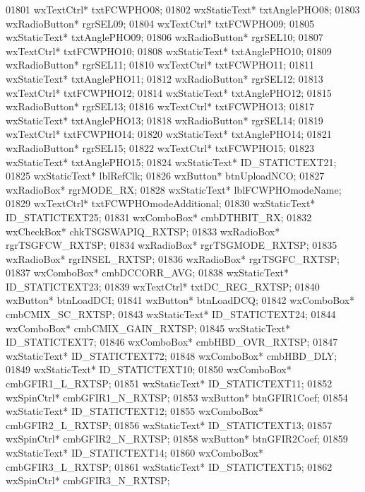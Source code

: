 \begin{DoxyCode}
01801         wxTextCtrl* txtFCWPHO08;
01802         wxStaticText* txtAnglePHO08;
01803         wxRadioButton* rgrSEL09;
01804         wxTextCtrl* txtFCWPHO09;
01805         wxStaticText* txtAnglePHO09;
01806         wxRadioButton* rgrSEL10;
01807         wxTextCtrl* txtFCWPHO10;
01808         wxStaticText* txtAnglePHO10;
01809         wxRadioButton* rgrSEL11;
01810         wxTextCtrl* txtFCWPHO11;
01811         wxStaticText* txtAnglePHO11;
01812         wxRadioButton* rgrSEL12;
01813         wxTextCtrl* txtFCWPHO12;
01814         wxStaticText* txtAnglePHO12;
01815         wxRadioButton* rgrSEL13;
01816         wxTextCtrl* txtFCWPHO13;
01817         wxStaticText* txtAnglePHO13;
01818         wxRadioButton* rgrSEL14;
01819         wxTextCtrl* txtFCWPHO14;
01820         wxStaticText* txtAnglePHO14;
01821         wxRadioButton* rgrSEL15;
01822         wxTextCtrl* txtFCWPHO15;
01823         wxStaticText* txtAnglePHO15;
01824         wxStaticText* ID_STATICTEXT21;
01825         wxStaticText* lblRefClk;
01826         wxButton* btnUploadNCO;
01827         wxRadioBox* rgrMODE_RX;
01828         wxStaticText* lblFCWPHOmodeName;
01829         wxTextCtrl* txtFCWPHOmodeAdditional;
01830         wxStaticText* ID_STATICTEXT25;
01831         wxComboBox* cmbDTHBIT_RX;
01832         wxCheckBox* chkTSGSWAPIQ_RXTSP;
01833         wxRadioBox* rgrTSGFCW_RXTSP;
01834         wxRadioBox* rgrTSGMODE_RXTSP;
01835         wxRadioBox* rgrINSEL_RXTSP;
01836         wxRadioBox* rgrTSGFC_RXTSP;
01837         wxComboBox* cmbDCCORR_AVG;
01838         wxStaticText* ID_STATICTEXT23;
01839         wxTextCtrl* txtDC_REG_RXTSP;
01840         wxButton* btnLoadDCI;
01841         wxButton* btnLoadDCQ;
01842         wxComboBox* cmbCMIX_SC_RXTSP;
01843         wxStaticText* ID_STATICTEXT24;
01844         wxComboBox* cmbCMIX_GAIN_RXTSP;
01845         wxStaticText* ID_STATICTEXT7;
01846         wxComboBox* cmbHBD_OVR_RXTSP;
01847         wxStaticText* ID_STATICTEXT72;
01848         wxComboBox* cmbHBD_DLY;
01849         wxStaticText* ID_STATICTEXT10;
01850         wxComboBox* cmbGFIR1_L_RXTSP;
01851         wxStaticText* ID_STATICTEXT11;
01852         wxSpinCtrl* cmbGFIR1_N_RXTSP;
01853         wxButton* btnGFIR1Coef;
01854         wxStaticText* ID_STATICTEXT12;
01855         wxComboBox* cmbGFIR2_L_RXTSP;
01856         wxStaticText* ID_STATICTEXT13;
01857         wxSpinCtrl* cmbGFIR2_N_RXTSP;
01858         wxButton* btnGFIR2Coef;
01859         wxStaticText* ID_STATICTEXT14;
01860         wxComboBox* cmbGFIR3_L_RXTSP;
01861         wxStaticText* ID_STATICTEXT15;
01862         wxSpinCtrl* cmbGFIR3_N_RXTSP;

\end{DoxyCode}
